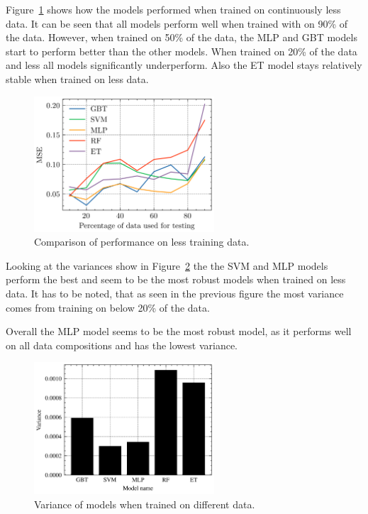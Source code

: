 Figure~\ref{fig:results-missing-values} shows how the models performed when trained on
continuously less data.
It can be seen that all models perform well when trained with on 90\% of the data.
However, when trained on 50\% of the data, the \ac{MLP}  and \ac{GBT} models start to perform
better than the
other models.
When trained on 20\% of the data and less all models significantly underperform.
Also the \ac{ET} model stays relatively stable when trained on less data.

\begin{figure}[h]
    \begin{tcolorbox}[arc=0pt,boxrule=0.5pt]
        \centering
        \includegraphics[width=0.6\textwidth]{chap5/images/missing_values_plot}
    \end{tcolorbox}
    \caption{Comparison of performance on less training data.}
    \label{fig:results-missing-values}
\end{figure}

Looking at the variances show in Figure~\ref{fig:variance-missing-values} the the \ac{SVM} and \ac{MLP} models
perform the best and seem to be the most robust models when trained on less data.
It has to be noted, that as seen in the previous figure the most variance comes from training on
below 20\% of the data.

Overall the \ac{MLP} model seems to be the most robust model, as it performs well on all data
compositions and has the lowest variance.

\begin{figure}[h]
    \begin{tcolorbox}[arc=0pt,boxrule=0.5pt]
        \centering
        \includegraphics[width=0.6\textwidth]{chap5/images/variance_missing_values}
    \end{tcolorbox}
    \caption{Variance of models when trained on different data.}
    \label{fig:variance-missing-values}
\end{figure}

